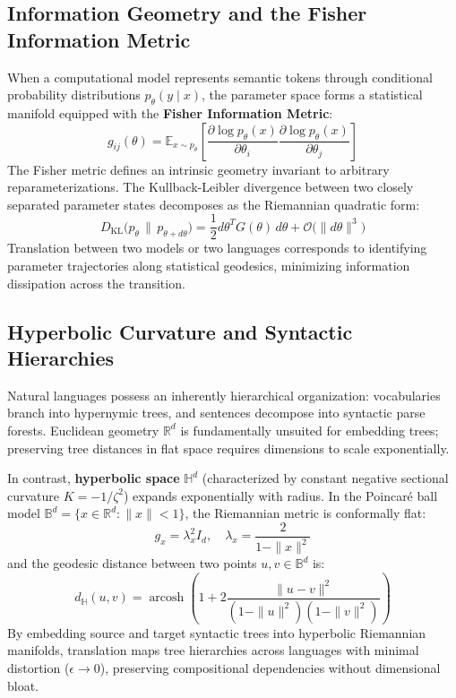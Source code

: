 \documentclass[11pt,letterpaper]{article}
\begin{document}
\subsection{Information Geometry and the Fisher Information Metric}
When a computational model represents semantic tokens through conditional probability distributions $p_\theta(y \mid x)$, the parameter space forms a statistical manifold equipped with the \textbf{Fisher Information Metric}:
\begin{equation}
g_{ij}(\theta) = \mathbb{E}_{x \sim p_\theta}\left[ \frac{\partial \log p_\theta(x)}{\partial \theta_i} \frac{\partial \log p_\theta(x)}{\partial \theta_j} \right]
\end{equation}
The Fisher metric defines an intrinsic geometry invariant to arbitrary reparameterizations. The Kullback-Leibler divergence between two closely separated parameter states decomposes as the Riemannian quadratic form:
\begin{equation}
D_{\text{KL}}\big(p_\theta \,\|\, p_{\theta + d\theta}\big) = \frac{1}{2} d\theta^T G(\theta) \, d\theta + \mathcal{O}\big(\|d\theta\|^3\big)
\end{equation}
Translation between two models or two languages corresponds to identifying parameter trajectories along statistical geodesics, minimizing information dissipation across the transition.

\subsection{Hyperbolic Curvature and Syntactic Hierarchies}
Natural languages possess an inherently hierarchical organization: vocabularies branch into hypernymic trees, and sentences decompose into syntactic parse forests. Euclidean geometry $\mathbb{R}^d$ is fundamentally unsuited for embedding trees; preserving tree distances in flat space requires dimensions to scale exponentially.

In contrast, \textbf{hyperbolic space} $\mathbb{H}^d$ (characterized by constant negative sectional curvature $K = -1/\zeta^2$) expands exponentially with radius. In the Poincaré ball model $\mathbb{B}^d = \{x \in \mathbb{R}^d : \|x\| < 1\}$, the Riemannian metric is conformally flat:
\begin{equation}
g_x = \lambda_x^2 I_d, \quad \lambda_x = \frac{2}{1 - \|x\|^2}
\end{equation}
and the geodesic distance between two points $u, v \in \mathbb{B}^d$ is:
\begin{equation}
d_{\mathbb{H}}(u, v) = \operatorname{arcosh}\left(1 + 2 \frac{\|u - v\|^2}{(1 - \|u\|^2)(1 - \|v\|^2)}\right)
\end{equation}
By embedding source and target syntactic trees into hyperbolic Riemannian manifolds, translation maps tree hierarchies across languages with minimal distortion ($\epsilon \to 0$), preserving compositional dependencies without dimensional bloat.
\end{document}

